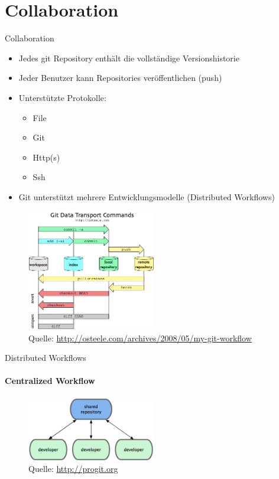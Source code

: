 \section{Collaboration}

\begin{frame}
  \tableofcontents[currentsection]
\end{frame}

\begin{frame}{Collaboration}
  \begin{itemize}
    \item Jedes git Repository enthält die vollständige Versionshistorie
    \item Jeder Benutzer kann Repositories veröffentlichen (push)
    \item Unterstützte Protokolle:
    \begin{itemize}
      \item File
      \item Git
      \item Http(s)
      \item Ssh
    \end{itemize}
    \item Git unterstützt mehrere Entwicklungsmodelle (Distributed Workflows)
  \end{itemize}
\end{frame}

\begin{frame}
  \begin{figure}
    \includegraphics[width=0.5\textwidth]{img/git-transport}
    \caption[format=empty]{Quelle: \url{http://osteele.com/archives/2008/05/my-git-workflow}}
  \end{figure}

\end{frame}

\begin{frame}{Distributed Workflows}
  \framesubtitle{Centralized Workflow}
  \begin{figure}
    \includegraphics[width=0.5\textwidth]{img/wf-centralized}
    \caption[format=empty]{Quelle: \url{http://progit.org}}
  \end{figure}
\end{frame}

